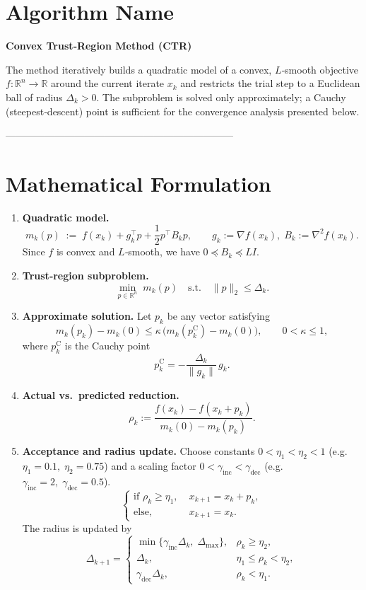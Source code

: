 \documentclass{article}
\begin{document}
\section*{Algorithm Name}
\textbf{Convex Trust‑Region Method (CTR)}  

The method iteratively builds a quadratic model of a convex, $L$‑smooth objective
\(f:\mathbb{R}^n\to\mathbb{R}\) around the current iterate \(x_k\) and restricts the trial step
to a Euclidean ball of radius \(\Delta_k>0\).  The subproblem is solved only approximately; a
Cauchy (steepest‑descent) point is sufficient for the convergence analysis presented below.

---------------------------------------------------------------------

\section*{Mathematical Formulation}
\begin{enumerate}
  \item \textbf{Quadratic model.}  
  \[
    m_k(p)\;:=\;f(x_k)+g_k^{\top}p+\frac12 p^{\top}B_k p,
    \qquad g_k:=\nabla f(x_k),\; B_k:=\nabla^2 f(x_k).
  \]
  Since \(f\) is convex and $L$‑smooth, we have \(0\preceq B_k \preceq L I\).

  \item \textbf{Trust‑region subproblem.}  
  \[
    \min_{p\in\mathbb{R}^n}\; m_k(p)\quad\text{s.t.}\quad \|p\|_2\le \Delta_k .
  \tag{TR$_k$}
  \]

  \item \textbf{Approximate solution.}  
  Let \(p_k\) be any vector satisfying
  \[
    m_k(p_k)-m_k(0)\le \kappa\,
    \bigl(m_k(p_k^{\text{C}})-m_k(0)\bigr),\qquad 0<\kappa\le1,
  \tag{A1}
  \]
  where \(p_k^{\text{C}}\) is the Cauchy point
  \[
    p_k^{\text{C}}=-\frac{\Delta_k}{\|g_k\|}\,g_k .
  \]

  \item \textbf{Actual vs.\ predicted reduction.}  
  \[
    \rho_k:=\frac{f(x_k)-f(x_k+p_k)}{m_k(0)-m_k(p_k)} .
  \tag{TRR}
  \]

  \item \textbf{Acceptance and radius update.}  
  Choose constants \(0<\eta_1<\eta_2<1\) (e.g. \(\eta_1=0.1,\;\eta_2=0.75\)) and a scaling factor
  \(0<\gamma_{\text{inc}}<\gamma_{\text{dec}}\) (e.g. \(\gamma_{\text{inc}}=2,\;\gamma_{\text{dec}}=0.5\)).
  \[
  \begin{cases}
    \text{if }\rho_k\ge\eta_1,\; & x_{k+1}=x_k+p_k,\\[2mm]
    \text{else}, & x_{k+1}=x_k .
  \end{cases}
  \]
  The radius is updated by
  \[
  \Delta_{k+1}=
  \begin{cases}
    \min\{\gamma_{\text{inc}}\Delta_k,\;\Delta_{\max}\}, & \rho_k\ge\eta_2,\\[2mm]
    \Delta_k, & \eta_1\le\rho_k<\eta_2,\\[2mm]
    \gamma_{\text{dec}}\Delta_k, & \rho_k<\eta_1 .
  \end{cases}
  \tag{RAD}
  \]

\end{enumerate}
\end{document}
